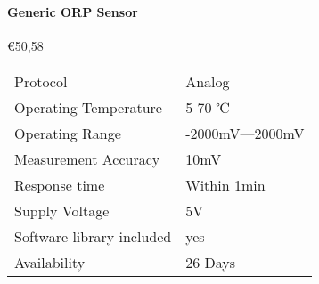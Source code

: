 \paragraph{Generic ORP Sensor}\mbox{€50,58} \cite{orpsensor}
\begin{table}[h!]
	\centering
	\quad
	\begin{tabular}{| l | l |}
    \hline
    Protocol & Analog\\
    Operating Temperature & 5-70 ℃ \\
    Operating Range &  -2000mV—2000mV\\
    Measurement Accuracy &  10mV \\
    Response time & Within 1min \\
    Supply Voltage & 5V \\
    Software library included & yes \\
    Availability & 26 Days \\
    \hline
	\end{tabular}
\end{table}